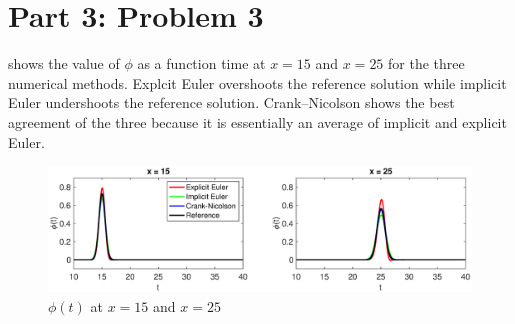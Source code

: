 \documentclass[reqno, 12pt]{amsart}
\begin{document}
    \section*{Part 3: Problem 3}
    \noindent {} shows the value of $\phi$ as a function time at $x =  15$ and $x = 25$ for the three numerical methods.
    Explcit Euler overshoots the reference solution while implicit Euler undershoots the reference solution.
    Crank--Nicolson shows the best agreement of the three because it is essentially an average of implicit and explicit Euler.
    \begin{figure}
        \centering
        \includegraphics[width=\textwidth]{P3.eps}
        \caption{$\phi(t)$ at $x = 15$ and $x = 25$}
        \label{fig:phiT}
    \end{figure}
\end{document}
